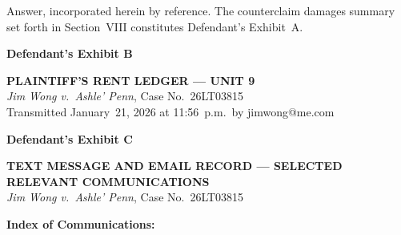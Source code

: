\documentclass[10pt,letterpaper,oneside]{extarticle}
\begin{document}
Answer, incorporated herein by reference. The counterclaim
damages summary set forth in Section~VIII constitutes
Defendant's Exhibit~A.
\newpage
{}
\begin{flushleft}
	\textbf{\large Defendant's Exhibit B}
\end{flushleft}
\begin{center}
	\textbf{PLAINTIFF'S RENT LEDGER --- UNIT 9}\\[4pt]
	\textit{Jim Wong v.\ Ashle' Penn},
	Case No.\ 26LT03815\\[4pt]
	Transmitted January~21, 2026 at 11:56~p.m.\
	by jimwong@me.com
\end{center}
\vspace{0.5em}

\newpage
{}
\begin{flushleft}
	\textbf{\large Defendant's Exhibit C}
\end{flushleft}
\begin{center}
	\textbf{TEXT MESSAGE AND EMAIL RECORD ---
		SELECTED RELEVANT COMMUNICATIONS}\\[4pt]
	\textit{Jim Wong v.\ Ashle' Penn},
	Case No.\ 26LT03815
\end{center}
\vspace{0.5em}
\noindent \textbf{Index of Communications:}
\end{document}
